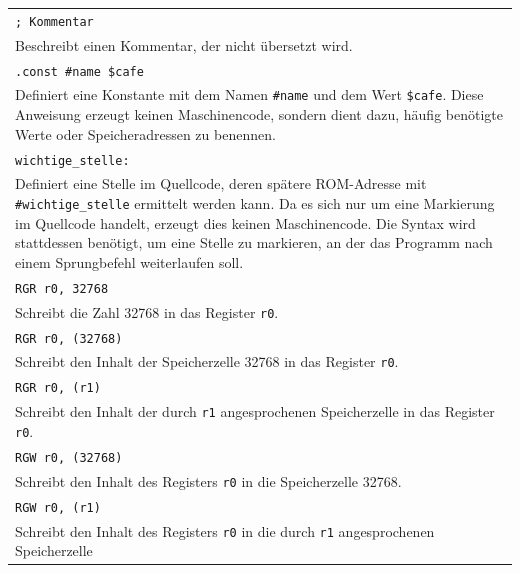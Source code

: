 \medskip
{
    \small

    \begin{longtable}{|p{\textwidth}|}
        \hline
        \verb|; Kommentar| \\
        Beschreibt einen Kommentar, der nicht übersetzt wird.
        \\

        \hline
        \verb|.const #name $cafe| \\
        Definiert eine Konstante mit dem Namen \verb|#name| und dem Wert \verb|$cafe|.
        Diese Anweisung erzeugt keinen Maschinencode, sondern dient dazu, häufig
        benötigte Werte oder Speicheradressen zu benennen.
        \\

        \hline
        \verb|wichtige_stelle:| \\
        Definiert eine Stelle im Quellcode, deren spätere ROM-Adresse mit
        \verb|#wichtige_stelle| ermittelt werden kann. Da es sich nur um eine
        Markierung im Quellcode handelt, erzeugt dies keinen Maschinencode.
        Die Syntax wird stattdessen benötigt, um eine Stelle zu markieren, an
        der das Programm nach einem Sprungbefehl weiterlaufen soll.
        \\

        \hline
        \hline

        \hline
        \verb|RGR r0, 32768| \\
        Schreibt die Zahl 32768 in das Register \texttt{r0}.
        \\

        \hline
        \verb|RGR r0, (32768)| \\
        Schreibt den Inhalt der Speicherzelle 32768 in das Register \texttt{r0}.
        \\

        \hline
        \verb|RGR r0, (r1)| \\
        Schreibt den Inhalt der durch \texttt{r1} angesprochenen Speicherzelle
        in das Register \texttt{r0}.
        \\

        \hline
        \verb|RGW r0, (32768)| \\
        Schreibt den Inhalt des Registers \texttt{r0} in die Speicherzelle 32768.
        \\

        \hline
        \verb|RGW r0, (r1)| \\
        Schreibt den Inhalt des Registers \texttt{r0} in die durch \texttt{r1}
        angesprochenen Speicherzelle
        \\


\end{longtable}}
